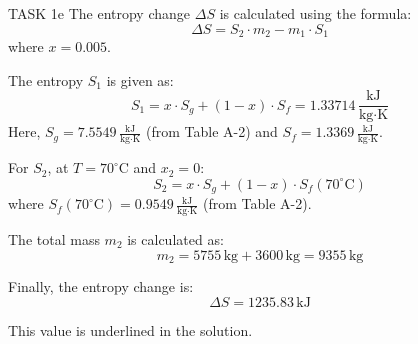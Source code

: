 TASK 1e  
The entropy change \( \Delta S \) is calculated using the formula:  
\[
\Delta S = S_2 \cdot m_2 - m_1 \cdot S_1
\]  
where \( x = 0.005 \).  

The entropy \( S_1 \) is given as:  
\[
S_1 = x \cdot S_g + (1 - x) \cdot S_f = 1.33714 \, \frac{\text{kJ}}{\text{kg·K}}
\]  
Here, \( S_g = 7.5549 \, \frac{\text{kJ}}{\text{kg·K}} \) (from Table A-2) and \( S_f = 1.3369 \, \frac{\text{kJ}}{\text{kg·K}} \).  

For \( S_2 \), at \( T = 70^\circ\text{C} \) and \( x_2 = 0 \):  
\[
S_2 = x \cdot S_g + (1 - x) \cdot S_f(70^\circ\text{C})
\]  
where \( S_f(70^\circ\text{C}) = 0.9549 \, \frac{\text{kJ}}{\text{kg·K}} \) (from Table A-2).  

The total mass \( m_2 \) is calculated as:  
\[
m_2 = 5755 \, \text{kg} + 3600 \, \text{kg} = 9355 \, \text{kg}
\]  

Finally, the entropy change is:  
\[
\Delta S = 1235.83 \, \text{kJ}
\]  

This value is underlined in the solution.